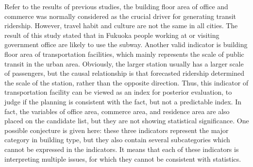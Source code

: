 %
Refer to the results of previous studies, the building floor area of office and commerce was normally considered as the crucial driver for generating transit ridership. However, travel habit and culture are not the same in all cities. The result of this study stated that in Fukuoka people working at or visiting government office are likely to use the subway. Another valid indicator is building floor area of transportation facilities, which mainly represents the scale of public transit in the urban area. Obviously, the larger station usually has a larger scale of passengers, but the causal relationship is that forecasted ridership determined the scale of the station, rather than the opposite direction. Thus, this indicator of transportation facility can be viewed as an index for posterior evaluation, to judge if the planning is consistent with the fact, but not a predictable index. In fact, the variables of office area, commerce area, and residence area are also placed on the candidate list, but they are not showing statistical significance. One possible conjecture is given here: these three indicators represent the major category in building type, but they also contain several subcategories which cannot be expressed in the indicators. It means that each of these indicators is interpreting multiple issues, for which they cannot be consistent with statistics.

